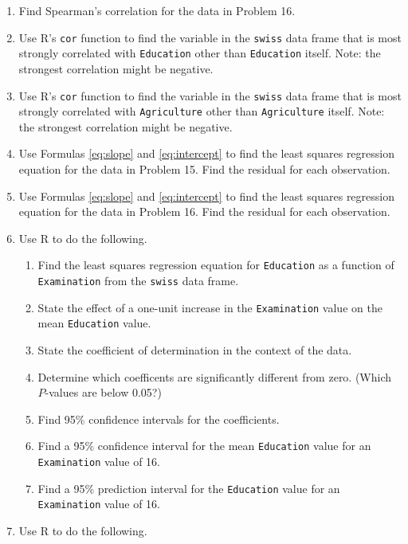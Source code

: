 \documentclass[
]{book}
\providecommand{\tightlist}{%
  \setlength{\itemsep}{0pt}\setlength{\parskip}{0pt}}
\theoremstyle{definition}
\theoremstyle{definition}
\theoremstyle{definition}
\theoremstyle{definition}
\theoremstyle{remark}
\begin{document}
\begin{enumerate}
\def\labelenumi{\arabic{enumi}.}
\setcounter{enumi}{17}
\item
  Find Spearman's correlation for the data in Problem 16.
\item
  Use R's \texttt{cor} function to find the variable in the \texttt{swiss} data frame that is most strongly correlated with \texttt{Education} other than \texttt{Education} itself. Note: the strongest correlation might be negative.
\item
  Use R's \texttt{cor} function to find the variable in the \texttt{swiss} data frame that is most strongly correlated with \texttt{Agriculture} other than \texttt{Agriculture} itself. Note: the strongest correlation might be negative.
\item
  Use Formulas \eqref{eq:slope} and \eqref{eq:intercept} to find the least squares regression equation for the data in Problem 15. Find the residual for each observation.
\item
  Use Formulas \eqref{eq:slope} and \eqref{eq:intercept} to find the least squares regression equation for the data in Problem 16. Find the residual for each observation.
\item
  Use R to do the following.

  \begin{enumerate}
  \def\labelenumii{\alph{enumii}.}
  \tightlist
  \item
    Find the least squares regression equation for \texttt{Education} as a function of \texttt{Examination} from the \texttt{swiss} data frame.
  \item
    State the effect of a one-unit increase in the \texttt{Examination} value on the mean \texttt{Education} value.
  \item
    State the coefficient of determination in the context of the data.
  \item
    Determine which coefficents are significantly different from zero. (Which \(P\)-values are below 0.05?)
  \item
    Find 95\% confidence intervals for the coefficients.
  \item
    Find a 95\% confidence interval for the mean \texttt{Education} value for an \texttt{Examination} value of 16.
  \item
    Find a 95\% prediction interval for the \texttt{Education} value for an \texttt{Examination} value of 16.
  \end{enumerate}
\item
  Use R to do the following.


\end{enumerate}
\end{document}
